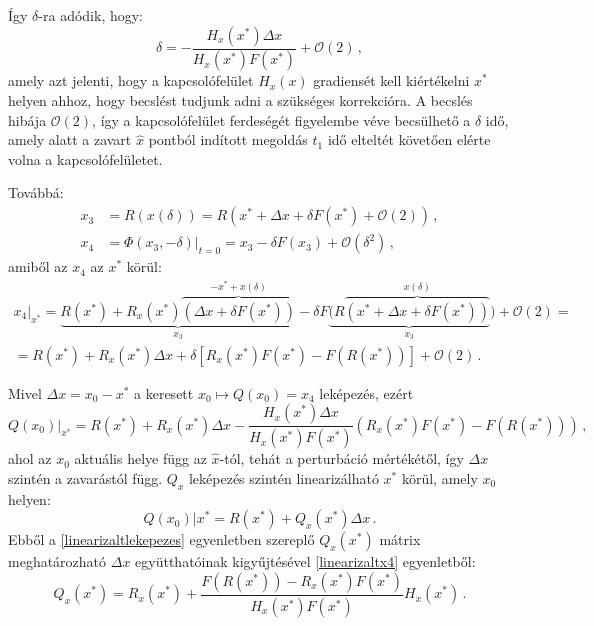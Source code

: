 Így $\delta$-ra adódik, hogy:
\begin{equation}
\delta=-\frac{H_x(x^*)\Delta x}{H_x(x^*)F(x^*)}+\mathcal{O}(2)\,,
\end{equation}
amely azt jelenti, hogy a kapcsolófelület $H_x(x)$ gradiensét kell kiértékelni $x^*$ helyen ahhoz, hogy becslést tudjunk adni a szükséges korrekcióra. A becslés hibája $\mathcal{O}(2)$, így a kapcsolófelület ferdeségét figyelembe véve becsülhető a $\delta$ idő, amely alatt a zavart $\hat x$ pontból indított megoldás $t_1$ idő elteltét követően elérte volna a kapcsolófelületet.\par
Továbbá:
\begin{align}
x_3&=R(x(\delta))=R(x^*+\Delta x+\delta F(x^*)+\mathcal{O}(2))\,, \\
x_4&=\Phi(x_3,-\delta)|_{t=0}=x_3-\delta F(x_3)+\mathcal{O}(\delta^2) \,,
\end{align}
amiből az $x_4$ az $x^*$ körül:
\begin{multline}
\left.x_4\right|_{x^*}=\underbrace{R(x^*)+R_x(x^*)\overbrace{(\Delta x+\delta F(x^*))}^{-x^*+x(\delta)}}_{x_3}-\delta F\underbrace{(R\overbrace{(x^*+\Delta x+\delta F(x^*))}^{x(\delta)}}_{x_3})+\mathcal{O}(2)=\\
=R(x^*)+R_x(x^*)\Delta x+ \delta [R_x(x^*)F(x^*)-F(R(x^*))]+\mathcal{O}(2)\,.
\end{multline}

Mivel $\Delta x=x_0-x^*$ a keresett $x_0 \mapsto Q(x_0)=x_4$ leképezés, ezért 
\begin{equation}
Q(x_0)|_{x^*}=R(x^*)+R_x(x^*)\Delta x-\frac{H_x(x^*)\Delta x}{H_x(x^*)F(x^*)}(R_x(x^*)F(x^*)-F(R(x^*)))\,,
\label{linearizaltx4}
\end{equation}
%
ahol az $x_0$ aktuális helye  függ az $\hat{ x}$-tól, tehát a perturbáció mértékétől, így $\Delta x$ szintén a zavarástól függ.
 $Q_x$ leképezés szintén linearizálható $x^*$ körül, amely $x_0$ helyen: 
\begin{equation}
Q(x_0)|{x^*}=R(x^*)+Q_x(x^*)\Delta x\,.
\label{linearizaltlekepezes}
\end{equation}
%
Ebből a \ref{linearizaltlekepezes} egyenletben szereplő $Q_x(x^*)$ mátrix meghatározható $\Delta x$ együtthatóinak kigyűjtésével \ref{linearizaltx4} egyenletből:
\begin{equation}
Q_x(x^*)=R_x(x^*)+\frac{F(R(x^*))-R_x(x^*)F(x^*)}{H_x(x^*)F(x^*)}H_x(x^*)\,.
\end{equation}

